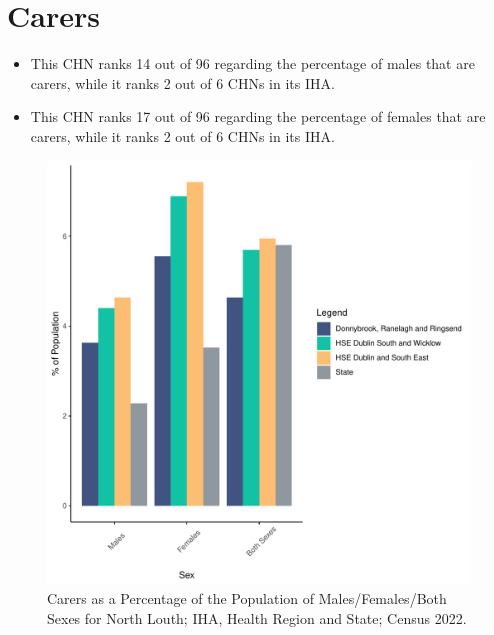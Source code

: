 \documentclass{article}
\begin{document}
\section{Carers}\label{sect:Carers}
\begin{itemize}
\item This CHN ranks  14 out of 96 regarding the percentage of males that are carers, while it ranks   2 out of 6 CHNs in its IHA.
\item This CHN ranks  17 out of 96 regarding the percentage of females that are carers, while it ranks   2 out of 6 CHNs in its IHA.
\end{itemize}
\begin{figure}[H]
	\centering
	\includegraphics[width = 150mm]{../figures/CareED.pdf}
	\caption{Carers as a Percentage of the Population of Males/Females/Both Sexes for North Louth; IHA, Health Region and State; Census 2022.}
	\label{fig:2ae19629-1a6a-13a3-e055-000000000001}
	\end{figure}
\end{document}
